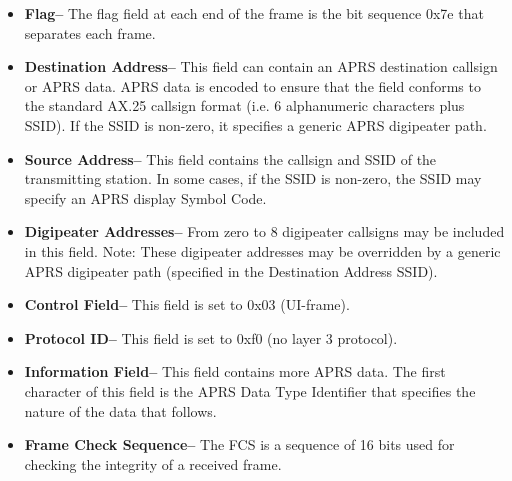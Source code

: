 \begin{itemize}


\item \textbf{Flag--} The flag field at each end of the frame is the bit sequence 0x7e
that separates each frame.

\item \textbf{Destination Address--} This field can contain an APRS destination
callsign or APRS data. APRS data is encoded to ensure that the field
conforms to the standard AX.25 callsign format (i.e. 6 alphanumeric
characters plus SSID). If the SSID is non-zero, it specifies a generic
APRS digipeater path.

\item \textbf{Source Address--} This field contains the callsign and SSID of the
transmitting station. In some cases, if the SSID is non-zero, the SSID
may specify an APRS display Symbol Code.

\item \textbf{Digipeater Addresses--} From zero to 8 digipeater callsigns may be
included in this field. Note: These digipeater addresses may be
overridden by a generic APRS digipeater path (specified in the
Destination Address SSID).

\item \textbf{Control Field--} This field is set to 0x03 (UI-frame).

\item \textbf{Protocol ID--} This field is set to 0xf0 (no layer 3 protocol).

\item \textbf{Information Field--} This field contains more APRS data. The first
character of this field is the APRS Data Type Identifier that specifies the
nature of the data that follows.

\item \textbf{Frame Check Sequence--} The FCS is a sequence of 16 bits used for
checking the integrity of a received frame.

\end{itemize}
